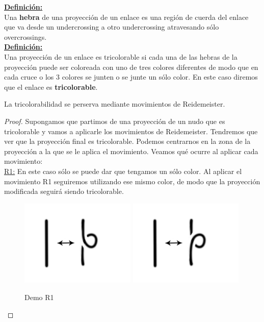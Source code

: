 \underline{\textbf{Definición:}}\\
Una\textbf{ hebra }de una proyección de un enlace es una región de cuerda del enlace que va desde un undercrossing a otro undercrossing atravesando sólo overcrossings.\\ 

\underline{\textbf{Definición:}}\\
Una proyección de un enlace es tricolorable si cada una de las hebras de la proyección puede ser coloreada con uno de tres colores diferentes de modo que en cada cruce o los 3 colores se junten o se junte un sólo color. En este caso diremos que el enlace es \textbf{tricolorable}. 

\begin{teo}
	La tricolorabilidad se perserva mediante movimientos de Reidemeister.
	\begin{proof}
		Supongamos que partimos de una proyección de un nudo que es tricolorable y vamos a aplicarle los movimientos de Reidemeister. Tendremos que ver que la proyección final es tricolorable. Podemos centrarnos en la zona de la proyección a la que se le aplica el movimiento. Veamos qué ocurre al aplicar cada movimiento:\\
		
		\underline{R1:}
		En este caso sólo se puede dar que tengamos un sólo color. Al aplicar el movimiento R1 seguiremos utilizando ese mismo color, de modo que la proyección modificada seguirá siendo tricolorable. 
		\begin{figure}[h!]
			\centering
			\includegraphics[width=5.5cm]{inudos/movi1.png}
			\includegraphics[width=5.5cm]{inudos/movi2.png}
			\caption{Demo R1}
			\label{demotri1} 
		\end{figure}
		

\end{proof}
\end{teo}
